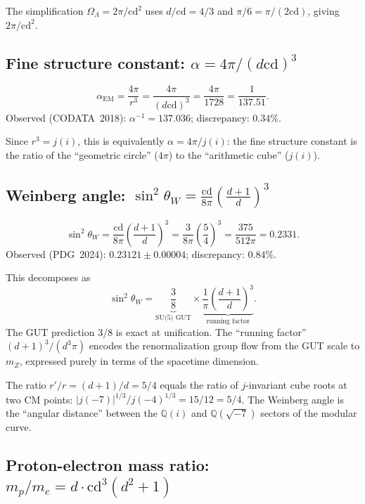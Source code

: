 \documentclass[aps,prl,twocolumn,superscriptaddress,nofootinbib]{revtex4-2}
\newcommand{\cd}{\mathrm{cd}}
\newcommand{\Q}{\mathbb{Q}}
\begin{document}
The simplification $\Omega_\Lambda = 2\pi/\cd^2$ uses $d/\cd = 4/3$
and $\pi/6 = \pi/(2\cd)$, giving $2\pi/\cd^2$.

\subsection{Fine structure constant: $\alpha = 4\pi / (d\cd)^3$}

\begin{equation}
  \alpha_{\mathrm{EM}} = \frac{4\pi}{r^3} = \frac{4\pi}{(d\cd)^3}
  = \frac{4\pi}{1728} = \frac{1}{137.51}.
  \label{eq:alpha}
\end{equation}
Observed (CODATA~2018): $\alpha^{-1} = 137.036$;
discrepancy: $0.34\%$.

Since $r^3 = j(i)$, this is equivalently
$\alpha = 4\pi / j(i)$: the fine structure constant is
the ratio of the ``geometric circle'' ($4\pi$) to the
``arithmetic cube'' ($j(i)$).

\subsection{Weinberg angle: $\sin^2\theta_W = \frac{\cd}{8\pi}\left(\frac{d+1}{d}\right)^{\!3}$}

\begin{equation}
  \sin^2\theta_W = \frac{\cd}{8\pi}\left(\frac{d+1}{d}\right)^{\!3}
  = \frac{3}{8\pi}\left(\frac{5}{4}\right)^{\!3}
  = \frac{375}{512\pi} = 0.2331.
  \label{eq:weinberg}
\end{equation}
Observed (PDG~2024): $0.23121 \pm 0.00004$;
discrepancy: $0.84\%$.

This decomposes as
\begin{equation}
  \sin^2\theta_W = \underbrace{\frac{3}{8}}_{\text{SU(5) GUT}}
  \times \underbrace{\frac{1}{\pi}\left(\frac{d+1}{d}\right)^{\!3}}_{\text{running factor}}.
  \label{eq:running}
\end{equation}
The GUT prediction $3/8$ is exact at unification.
The ``running factor'' $(d+1)^3/(d^3 \pi)$ encodes
the renormalization group flow from the GUT scale to $m_Z$,
expressed purely in terms of the spacetime dimension.

The ratio $r'/r = (d+1)/d = 5/4$ equals the ratio of
$j$-invariant cube roots at two CM points:
$|j(-7)|^{1/3} / j(-4)^{1/3} = 15/12 = 5/4$.
The Weinberg angle is the ``angular distance'' between
the $\Q(i)$ and $\Q(\sqrt{-7})$ sectors of the modular curve.

\subsection{Proton-electron mass ratio: $m_p/m_e = d \cdot \cd^3 (d^2+1)$}
\end{document}
